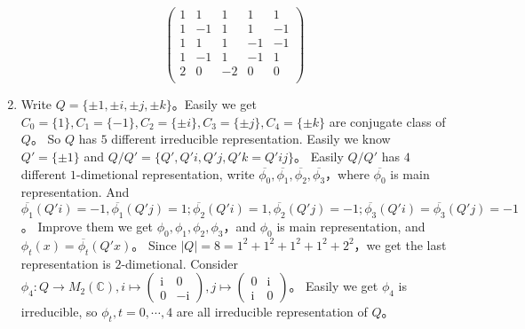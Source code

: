 \documentclass{ctexart}
\begin{document}
\begin{solution}
\begin{enumerate}
\[\begin{pmatrix}
          1 & 1  & 1  & 1  & 1  \\
          1 & -1 & 1  & 1  & -1 \\
          1 & 1  & 1  & -1 & -1 \\
          1 & -1 & 1  & -1 & 1  \\
          2 & 0  & -2 & 0  & 0  \\
        \end{pmatrix}
      \]
    \item
      Write \(Q=\{\pm 1,\pm i,\pm j,\pm k\}\)\nolinebreak[4]。Easily we get \(C_0=\{1\},C_1=\{- 1\},C_2=\{\pm i\},C_3=\{\pm j\},C_4=\{\pm k\}\) are conjugate class of \(Q\)\nolinebreak[4]。
      So \(Q\) has \(5\) different irreducible representation.
      Easily we know \(Q'=\{\pm 1\}\) and \(Q / Q'=\{Q',Q'i,Q'j,Q'k=Q'ij\}\)\nolinebreak[4]。
      Easily \(Q / Q'\) has \(4\) different \(1\)-dimetional representation, write \(\overline{\phi_0},\overline{\phi_1},\overline{\phi_2},\overline{\phi_3}\)\nolinebreak[4]，where \(\overline{\phi_0}\) is main representation.
      And \(\overline{\phi_1}(Q'i)=-1,\overline{\phi_1}(Q'j)=1;\overline{\phi_2}(Q'i)=1,\overline{\phi_2}(Q'j)=-1;\overline{\phi_3}(Q'i)=\overline{\phi_3}(Q'j)=-1\)\nolinebreak[4]。
      Improve them we get \(\phi_0,\phi_1,\phi_2,\phi_3\)\nolinebreak[4]，and \(\phi_0\) is main representation, and
      \(\phi_t(x)=\overline{\phi_t}(Q'x)\)\nolinebreak[4]。
      Since \(|Q|=8=1^2+1^2+1^2+1^2+2^2\)\nolinebreak[4]，we get the last representation is \(2\)-dimetional.
      Consider \(\phi_4:Q \to M_2(\mathbb{C}),i \mapsto
        \begin{pmatrix}
          \mathrm{i} & 0           \\
          0          & -\mathrm{i}
        \end{pmatrix}, j \mapsto
        \begin{pmatrix}
          0          & \mathrm{i} \\
          \mathrm{i} & 0
      \end{pmatrix}\)\nolinebreak[4]。
      Easily we get \(\phi_4\) is irreducible, so \(\phi_t,t=0,\cdots,4\) are all irreducible representation of \(Q\)\nolinebreak[4]。


\end{enumerate}
\end{solution}
\end{document}
